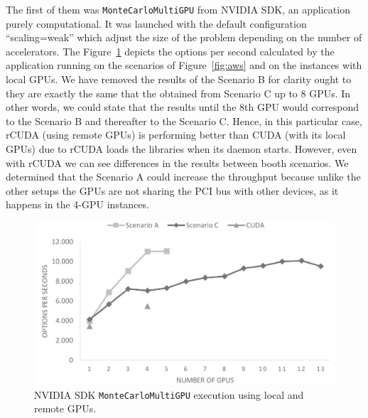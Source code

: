 \documentclass[a4paper,twoside]{article}
\begin{document}
The first of them was {\tt MonteCarloMultiGPU} from NVIDIA SDK, an application purely computational. 
It was launched with the default configuration ``scaling=weak'' which adjust the size of the problem depending on the number of accelerators.
The Figure~\ref{fig:mont-opt} depicts the options per second calculated by the application running on the scenarios of Figure~\ref{fig:aws} and on the instances with local GPUs. 
We have removed the results of the Scenario B for clarity ought to they are exactly the same that the obtained from Scenario C up to 8 GPUs. 
In other words, we could state that the results until the 8th GPU would correspond to the Scenario B and thereafter to the Scenario C.
Hence, in this particular case, rCUDA (using remote GPUs) is performing better than CUDA (with its local GPUs) due to rCUDA loads the libraries when its daemon starts.
However, even with rCUDA we can see differences in the results between booth scenarios. We determined that the Scenario A could increase the throughput because
unlike the other setups the GPUs are not sharing the PCI bus with other devices, as it happens in the 4-GPU instances.
\begin{figure}[htb]
  \centering
  \includegraphics[width=\linewidth]{images/mont.pdf}
  \caption{NVIDIA SDK {\tt MonteCarloMultiGPU} execution using local and remote GPUs.}
  \label{fig:mont-opt}
\end{figure}
\end{document}
